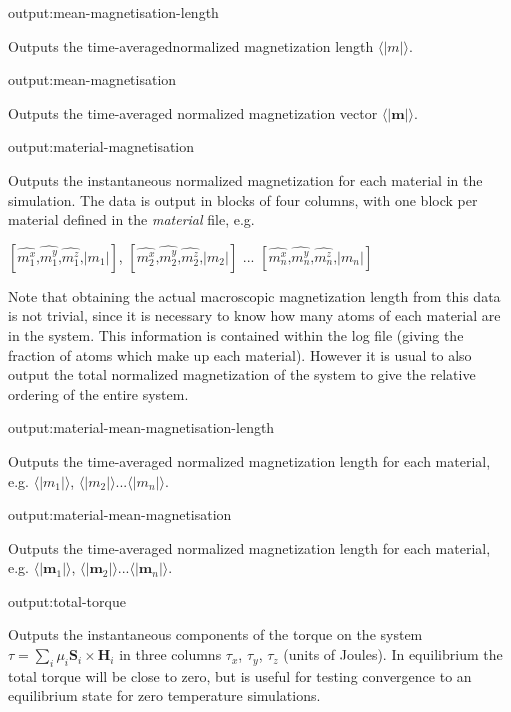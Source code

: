 {\zicf output:mean-magnetisation-length} Outputs the time-averaged\newline normalized magnetization length $\langle|m|\rangle$.

{\zicf output:mean-magnetisation} Outputs the time-averaged normalized magnetization vector $\langle|\mathbf{m}|\rangle$.

{\zicf output:material-magnetisation} Outputs the instantaneous normalized magnetization for each material in the simulation. The data is output in blocks of four columns, with one block per material defined in
the \textit{material} file, e.g.

\begin{center}
$\left[ \hat{m_1^x} \textrm{,} \hat{m_1^y} \textrm{,} \hat{m_1^z} \textrm{,} |m_1| \right]$,
$\left[ \hat{m_2^x} \textrm{,} \hat{m_2^y} \textrm{,} \hat{m_2^z} \textrm{,} |m_2| \right]$ ...
$\left[ \hat{m_n^x} \textrm{,} \hat{m_n^y} \textrm{,} \hat{m_n^z} \textrm{,} |m_n| \right]$
\end{center}

Note that obtaining the actual macroscopic magnetization length from this data is not trivial, since it is necessary to know how many atoms of each material are in the system. This information is contained within the log file (giving the fraction of atoms which make up each material). However it is usual to also output the total normalized magnetization of the system to give the relative ordering of the entire system.

{\zicf output:material-mean-magnetisation-length}
Outputs the time-averaged normalized magnetization length for each material, e.g. $\langle|m_1|\rangle$, $\langle|m_2|\rangle$...$\langle|m_n|\rangle$.

{\zicf output:material-mean-magnetisation} Outputs the time-averaged normalized magnetization length for each material, e.g. $\langle|\mathbf{m}_1|\rangle$, $\langle|\mathbf{m}_2|\rangle$...$\langle|\mathbf{m}_n|\rangle$.

{\zicf output:total-torque} Outputs the instantaneous components of the torque on the system $\tau = \sum_i\mu_i \mathbf{S}_i \times \mathbf{H}_i$ in three columns $\tau_x$, $\tau_y$, $\tau_z$ (units of Joules). In equilibrium the total torque will be close to zero, but is useful for testing convergence to an equilibrium state for zero temperature simulations.

